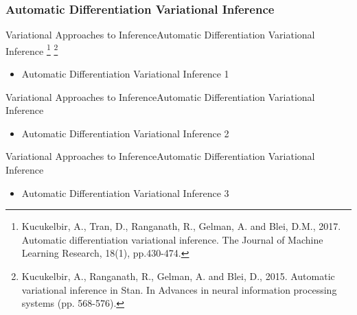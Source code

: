 \documentclass[AERbeamer%
              ,optEnglish%
              ,optBiber%
              ,optBibstyleAlphabetic%
              ,optBeamerClassicFormat%
              ]{AERlatex}%
\begin{document}
\subsubsection*{Automatic Differentiation Variational Inference}
\begin{frame}[c]{Variational Approaches to Inference}{Automatic Differentiation Variational Inference \footnote{Kucukelbir, A., Tran, D., Ranganath, R., Gelman, A. and Blei, D.M., 2017.
                                                                                                                Automatic differentiation variational inference. The Journal of Machine
                                                                                                                Learning Research, 18(1), pp.430-474.}
                                                                                                      \footnote{Kucukelbir, A., Ranganath, R., Gelman, A. and Blei, D., 2015. Automatic
                                                                                                                variational inference in Stan. In Advances in neural information processing
                                                                                                                systems (pp. 568-576).}}
    \centering
    \begin{itemize}
        \item Automatic Differentiation Variational Inference 1
    \end{itemize}
\end{frame}


\begin{frame}[c]{Variational Approaches to Inference}{Automatic Differentiation Variational Inference}
    \centering
    \begin{itemize}
        \item Automatic Differentiation Variational Inference 2
    \end{itemize}
\end{frame}


\begin{frame}[c]{Variational Approaches to Inference}{Automatic Differentiation Variational Inference}
    \centering
    \begin{itemize}
        \item Automatic Differentiation Variational Inference 3
    \end{itemize}
\end{frame}
\end{document}
